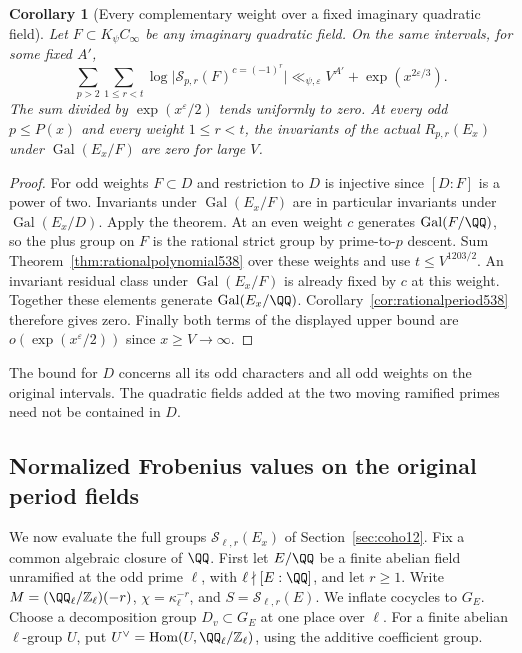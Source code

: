 \documentclass[a4paper,11pt]{article}
\newtheorem{corollary}[proposition]{Corollary}
\theoremstyle{definition}
\theoremstyle{remark}
\newcommand{\ZZ}{\mathbb Z}\newcommand{\ord}{\operatorname{ord}}
\numberwithin{equation}{section}
\begin{document}
\begin{corollary}[Every complementary weight over a fixed imaginary quadratic field]
\leavevmode\label{cor:fixedimaginary539}
Let \(F\subset K_\psi C_\infty\) be any imaginary quadratic
field. On the same intervals, for some fixed \(A'\),
\[
 \sum_{p>2}\sum_{1\le r<t}
   \log\big|\mathcal S_{p,r}(F)^{c=(-1)^r}\big|
           \ll_{\psi,\varepsilon} V^{A'}+\exp(x^{2\varepsilon/3}).
\]
The sum divided by \(\exp(x^\varepsilon/2)\) tends uniformly to
zero. At every odd \(p\le P(x)\) and every weight \(1\le r<t\),
the invariants of the actual \(R_{p,r}(E_x)\) under
\(\operatorname{Gal}(E_x/F)\) are zero for large \(V\).
\end{corollary}
\begin{proof}
For odd weights \(F\subset D\) and restriction to \(D\) is
injective since \([D:F]\) is a power of two. Invariants under
\(\operatorname{Gal}(E_x/F)\) are in particular invariants
under \(\operatorname{Gal}(E_x/D)\). Apply the theorem.
At an even weight \(c\) generates \(\operatorname{Gal}(F/\QQ)\),
so the plus group on \(F\) is the rational strict group by
prime-to-\(p\) descent. Sum Theorem~\ref{thm:rationalpolynomial538}
over these weights and use \(t\le V^{1203/2}\). An invariant
residual class under \(\operatorname{Gal}(E_x/F)\) is already
fixed by \(c\) at this weight. Together these elements generate
\(\operatorname{Gal}(E_x/\QQ)\). Corollary~\ref{cor:rationalperiod538}
therefore gives zero. Finally both terms of the displayed
upper bound are \(o(\exp(x^\varepsilon/2))\) since
\(x\ge V\to\infty\).
\end{proof}

The bound for \(D\) concerns all its odd characters and all odd
weights on the original intervals. The quadratic fields added
at the two moving ramified primes need not be contained in \(D\).


\subsection{Normalized Frobenius values on the original period fields}
\label{sec:normalizedstrict600}

We now evaluate the full groups \(\mathcal S_{\ell,r}(E_x)\)
of Section~\ref{sec:coho12}. Fix a common algebraic closure
of \(\QQ\). First let \(E/\QQ\) be a finite abelian field
unramified at the odd prime \(\ell\), with
\(\ell\nmid[E:\QQ]\), and let \(r\ge1\). Write
\(M=(\QQ_\ell/\ZZ_\ell)(-r)\), \(\chi=\kappa_\ell^{-r}\),
and \(S=\mathcal S_{\ell,r}(E)\). We inflate cocycles
to \(G_E\). Choose a decomposition group \(D_v\subset G_E\)
at one place over \(\ell\). For a finite abelian
\(\ell\)-group \(U\), put
\(U^\vee=\operatorname{Hom}(U,\QQ_\ell/\ZZ_\ell)\),
using the additive coefficient group.
\end{document}
